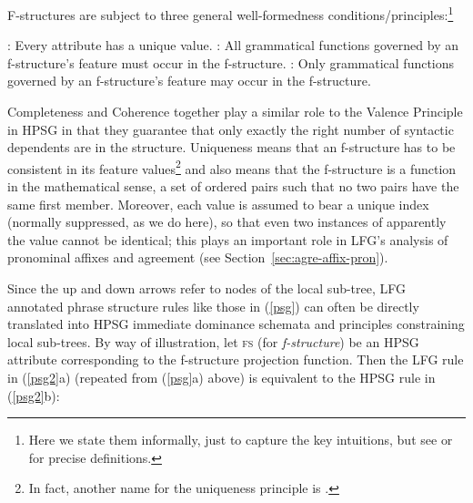 \largerpage
\noindent
F-structures are subject to three general well-formedness conditions/principles:\footnote{Here we state them informally, just to capture the key intuitions, but see \citet[37 (reprint pagination)]{KB82a-u} or \citet[52--53]{dalrymple;ea19} for precise definitions.}%
%
\begin{exe}
  \ex {}: 
Every attribute has a unique value.
\ex {}: All grammatical functions governed by an f-structure's  feature must occur in the f-structure. 
  \ex {}: Only grammatical functions governed by an f-structure's  feature may occur in the f-structure.
\end{exe}
%
Completeness and Coherence together play a similar role to the Valence Principle in HPSG \citep[348]{ps2} in that they guarantee that only exactly the right number of syntactic dependents are in the structure.  Uniqueness means that an f-structure has to be consistent in its feature values\footnote{In fact, another name for the uniqueness principle is  \citep[53]{dalrymple;ea19}.} and also means that the f-structure is a function in the mathematical sense, a set of ordered pairs such that no two pairs have the same first member. Moreover, each  value is assumed to bear a unique index (normally suppressed, as we do here), so that even two instances of apparently the   value cannot be identical; this plays an important role in LFG's analysis of pronominal affixes and agreement (see Section~\ref{sec:agre-affix-pron}).

\largerpage
Since the up and down arrows refer to nodes of the local sub-tree, LFG annotated phrase structure rules like those in (\ref{psg}) can often be directly translated into HPSG immediate dominance schemata and principles constraining local sub-trees.  
By way of illustration, let \textsc{fs} (for \textit{f-structure}) be an HPSG attribute corresponding to the f-structure projection function.  Then the LFG rule in (\ref{psg2}a) (repeated from (\ref{psg}a) above) is equivalent to the  HPSG rule in (\ref{psg2}b):

\eal 
 \label{psg2}
\ex
\label{psg2a}
{
}
               
